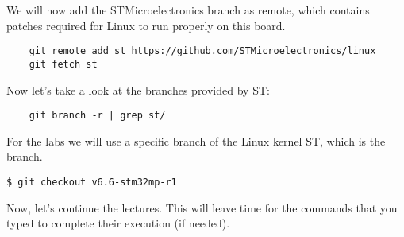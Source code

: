 We will now add the STMicroelectronics branch as remote, which contains
patches required for Linux to run properly on this board.

\begin{verbatim}
    git remote add st https://github.com/STMicroelectronics/linux
    git fetch st
\end{verbatim}
Now let's take a look at the branches provided by ST:
\begin{verbatim}
    git branch -r | grep st/
\end{verbatim}

For the labs we will use a specific branch of the Linux kernel ST, which is
the  branch.
\begin{verbatim}
$ git checkout v6.6-stm32mp-r1
\end{verbatim}

Now, let's continue the lectures. This will leave time for the commands
that you typed to complete their execution (if needed).

